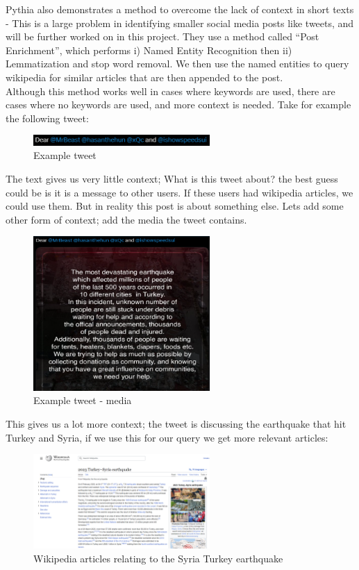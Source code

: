 Pythia also demonstrates a method to overcome the lack of context in short texts - This is a large problem in identifying
smaller social media posts like tweets, and will be further worked on in this project. They use a method called ``Post Enrichment'',
which performs i) Named Entity Recognition then ii) Lemmatization and stop word removal. We then use the named entities to query
wikipedia for similar articles that are then appended to the post.\\

Although this method works well in cases where keywords are used, there are cases where no keywords are used, and more context
is needed. Take for example the following tweet:
\begin{figure}[htbp]
    \centering
    \includegraphics[width=0.6\textwidth]{../images/tweet-example2.png}
    \caption{Example tweet}
    \label{fig:tweet-example}
\end{figure}

The text gives us very little context; What is this tweet about? the best guess could be
is it is a message to other users. If these users had wikipedia articles, we could use them. But in reality this post is about something else.
Lets add some other form of context; add the media the tweet contains.
\newpage
\begin{figure}[hbtp]
    \centering
    \includegraphics[width=0.6\textwidth]{../images/tweet-media.png}
    \caption{Example tweet - media}
    \label{fig:tweet-media}
\end{figure}
This gives us a lot more context; the tweet is discussing the earthquake that hit Turkey and Syria, if we use this for our query we get more relevant
articles:

\begin{figure}[htbp]
    \centering
    \includegraphics[width=0.6\textwidth]{../images/post-context-example.png}
    \caption{Wikipedia articles relating to the Syria Turkey earthquake}
    \label{fig:blastpremier}
\end{figure}

